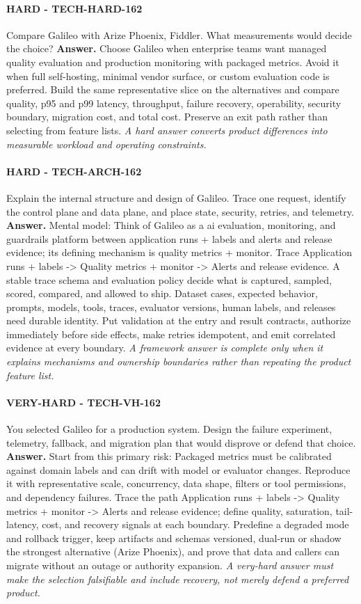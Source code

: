\paragraph{HARD - TECH-HARD-162} Compare Galileo with Arize Phoenix, Fiddler. What measurements would decide the choice?
\textbf{Answer.} Choose Galileo when enterprise teams want managed quality evaluation and production monitoring with packaged metrics. Avoid it when full self-hosting, minimal vendor surface, or custom evaluation code is preferred. Build the same representative slice on the alternatives and compare quality, p95 and p99 latency, throughput, failure recovery, operability, security boundary, migration cost, and total cost. Preserve an exit path rather than selecting from feature lists.
\textit{A hard answer converts product differences into measurable workload and operating constraints.}
\paragraph{HARD - TECH-ARCH-162} Explain the internal structure and design of Galileo. Trace one request, identify the control plane and data plane, and place state, security, retries, and telemetry.
\textbf{Answer.} Mental model: Think of Galileo as a ai evaluation, monitoring, and guardrails platform between application runs + labels and alerts and release evidence; its defining mechanism is quality metrics + monitor. Trace Application runs + labels -> Quality metrics + monitor -> Alerts and release evidence. A stable trace schema and evaluation policy decide what is captured, sampled, scored, compared, and allowed to ship. Dataset cases, expected behavior, prompts, models, tools, traces, evaluator versions, human labels, and releases need durable identity. Put validation at the entry and result contracts, authorize immediately before side effects, make retries idempotent, and emit correlated evidence at every boundary.
\textit{A framework answer is complete only when it explains mechanisms and ownership boundaries rather than repeating the product feature list.}
\paragraph{VERY-HARD - TECH-VH-162} You selected Galileo for a production system. Design the failure experiment, telemetry, fallback, and migration plan that would disprove or defend that choice.
\textbf{Answer.} Start from this primary risk: Packaged metrics must be calibrated against domain labels and can drift with model or evaluator changes. Reproduce it with representative scale, concurrency, data shape, filters or tool permissions, and dependency failures. Trace the path Application runs + labels -> Quality metrics + monitor -> Alerts and release evidence; define quality, saturation, tail-latency, cost, and recovery signals at each boundary. Predefine a degraded mode and rollback trigger, keep artifacts and schemas versioned, dual-run or shadow the strongest alternative (Arize Phoenix), and prove that data and callers can migrate without an outage or authority expansion.
\textit{A very-hard answer must make the selection falsifiable and include recovery, not merely defend a preferred product.}
